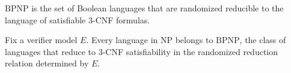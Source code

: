 \begin{definition}
\label{Randomized.BPNP}
\leanok
{}
$\mathrm{BPNP}$ is the set of Boolean languages that are randomized reducible to the
language of satisfiable 3-CNF formulas.
\end{definition}

\begin{theorem}
\label{Randomized.NP_subset_BPNP}
\leanok
{}
Fix a verifier model $E$. Every language in $\mathrm{NP}$ belongs to $\mathrm{BPNP}$,
the class of languages that reduce to $3$-CNF satisfiability in the randomized reduction
relation determined by $E$.
\end{theorem}
